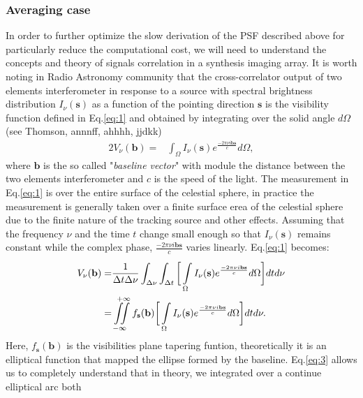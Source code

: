 \subsubsection{Averaging case}
In order to further optimize the slow derivation of the PSF described above for particularly reduce the computational
cost, we will need to understand the concepts and theory of signals correlation in a synthesis imaging array.
It is worth noting in Radio Astronomy community that the cross-correlator output of two elements interferometer
in response to a source with spectral brightness distribution $I_{\nu}(\mathbf{s})$ as a function of the pointing direction $\mathbf{s}$ 
is the visibility function defined in Eq.\ref{eq:1} and obtained by integrating
over the solid angle $d\Omega$ (see Thomson, annnff, ahhhh, jjdkk)
\begin{alignat}{2}
V_{\nu}(\mathbf{b}) =& \int_{\Omega}I_{\nu}(\mathbf{s})e^{\frac{-2\pi\nu i \mathbf{b}\mathbf{s}}{c}}d\Omega, \label{eq:1}
\end{alignat}
where $\mathbf{b}$  is the so called "\textit{baseline vector}" with module the distance between the two elements
interferometer and $c$ is the speed of the light. The measurement in Eq.\ref{eq:1} is over the entire 
surface of the celestial sphere, in practice the measurement is generally taken over a finite surface erea of 
the celestial sphere due to the  
finite nature of the tracking source and other effects. Assuming that the frequency $\nu$ and the 
time $t$ change small  enough so that $I_{\nu}(\mathbf{s})$
remains constant while the complex phase, $\frac{-2\pi\nu i \mathbf{b}\mathbf{s}}{c}$ varies linearly.   Eq.\ref{eq:1} becomes:
\begin{alignat}{2}
V_{\nu}(\mathbf{b}) =& \frac{1}{\Delta t \Delta \nu}\int_{\Delta \nu}^{}\int_{\Delta t}^{}\bigg[\int\limits_{\Omega}^{}I_{\nu}(\mathbf{s})e^{\frac{-2\pi\nu i \mathbf{b}\mathbf{s}}{c}} d\Omega\bigg] dt d\nu \label{eq:2}\\	    
		    =& \iint\limits_{-\infty}^{\hspace{.3cm}+\infty}f_{\mathbf{s}}(\mathbf{b})\bigg[\int\limits_{\Omega}^{}I_{\nu}(\mathbf{s})e^{\frac{-2\pi\nu i \mathbf{b}\mathbf{s}}{c}}d\Omega \bigg]dt d\nu  \label{eq:3}.
\end{alignat}
Here, $f_{\mathbf{s}}(\mathbf{b})$ is the visibilities plane tapering funtion, theoretically it is an elliptical function that
mapped the ellipse formed by the baseline.
Eq.\ref{eq:3} allows us to completely understand that in theory, we integrated over a continue elliptical arc both
